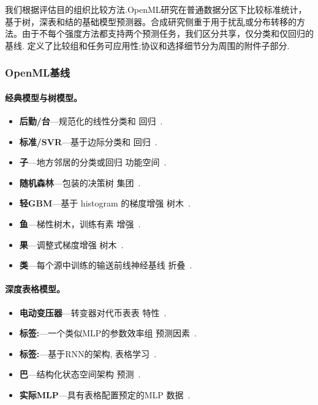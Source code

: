 我们根据评估目的组织比较方法.OpenML研究在普通数据分区下比较标准统计，基于树，深表和结的基础模型预测器。合成研究侧重于用于扰乱或分布转移的方法。由于不每个强度方法都支持两个预测任务，我们区分共享，仅分类和仅回归的基线.
定义了比较组和任务可应用性;协议和选择细节分为周围的附件子部分.

\subsubsection{OpenML基线}

\paragraph{经典模型与树模型。}
\begin{itemize}
  \setlength{\itemsep}{1pt}
  \setlength{\parskip}{0pt}
  \item \textbf{后勤/台}---规范化的线性分类和
回归~\citep{cox1958binary,hoerl1970ridge}.
  \item \textbf{标准/SVR}---基于边际分类和
回归~\citep{cortes1995svm,drucker1996svr}.
  \item \textbf{子}---地方邻居的分类或回归
功能空间~\citep{cover1967knn}.
  \item \textbf{随机森林}---包装的决策树
集团~\citep{breiman2001randomforests}.
  \item \textbf{轻GBM}---基于 histogram 的梯度增强
树木~\citep{ke2017lightgbm}.
  \item \textbf{鱼}---梯性树木，训练有素
增强~\citep{prokhorenkova2018catboost}.
  \item \textbf{果}---调整式梯度增强
树木~\citep{chen2016xgboost}.
  \item \textbf{类}---每个源中训练的输送前线神经基线
折叠~\citep{rumelhart1986backprop}.
\end{itemize}

\paragraph{深度表格模型。}
\begin{itemize}
  \setlength{\itemsep}{1pt}
  \setlength{\parskip}{0pt}
  \item \textbf{电动变压器}---转变器对代币表表
特性~\citep{gorishniy2021fttransformer}.
  \item \textbf{标签:}---一个类似MLP的参数效率组
预测因素~\citep{gorishniy2025tabm}.
  \item \textbf{标签:}---基于RNN的架构,
表格学习~\citep{thielmann2024tabularnn}.
  \item \textbf{巴}---结构化状态空间架构
预测~\citep{ahamed2024mambatab}.
  \item \textbf{实际MLP}---具有表格配置预定的MLP
数据~\citep{holzmueller2024realmlp}.
\end{itemize}

